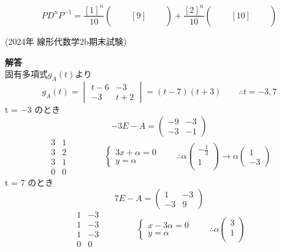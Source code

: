 \[PD^nP^{-1}=
\frac{[1]^n}{10}
\begin{pmatrix}
  & & \\
  \quad & [9] & \quad \\
  & & 
\end{pmatrix}
+
\frac{[2]^n}{10}
\begin{pmatrix}
  & & \\
  \quad & [10] & \quad \\
  & & 
\end{pmatrix}
\]
\begin{flushright}
    (2024年 線形代数学2b期末試験)
\end{flushright}

\noindent
\textbf{解答}\\
\hspace{1em}
固有多項式$g_A(t)$より
\[ 
g_A(t)=
\begin{vmatrix}
  t-6 & -3 \\
   -3 & t+2 
\end{vmatrix}
=(t-7)(t+3) \qquad \therefore t = -3,7
\]
t = $-3$ のとき
\[
-3E - A = 
\begin{pmatrix}
  -9 & -3 \\
  -3 & -1
\end{pmatrix}\]
\[
\begin{array}{cc} 
  3 & 1 \\    
  3 & 2 \\
  \hline
  3 & 1 \\
  0 & 0
\end{array}
\qquad \qquad 
\begin{cases} 
  3 x + \alpha = 0\\
  y = \alpha
\end{cases}
\qquad
\therefore
\alpha
\begin{pmatrix}
  - \frac{1}{3}\\
  1 \\
\end{pmatrix}
\rightarrow \alpha
\begin{pmatrix}
  1\\
  -3 
\end{pmatrix}
\] 
t = 7 のとき
\[
7E - A = 
\begin{pmatrix}
  1 & -3 \\
  -3 & 9
\end{pmatrix}\]
\[
\begin{array}{cc}
  1 & -3 \\    
  1 & -3 \\
  \hline
  1 & -3 \\
  0 & 0
\end{array}
\qquad \qquad
\begin{cases}
  x - 3 \alpha = 0\\
  y = \alpha
\end{cases}
\qquad
\therefore
\alpha
\begin{pmatrix}
  3\\
  1 \\
\end{pmatrix}
\] 
